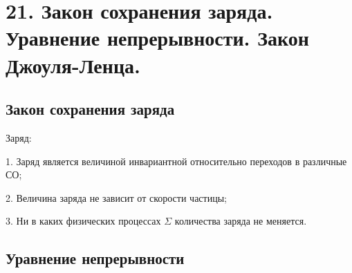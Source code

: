 


\newpage
\section*{21. Закон сохранения заряда. Уравнение непрерывности. Закон Джоуля-Ленца.}
 
\subsection*{Закон сохранения заряда}

Заряд:

1. Заряд является величиной инвариантной относительно переходов в различные СО;

2. Величина заряда не зависит от скорости частицы;

3. Ни в каких физических процессах $\Sigma$ количества заряда не меняется. 

\subsection*{Уравнение непрерывности}